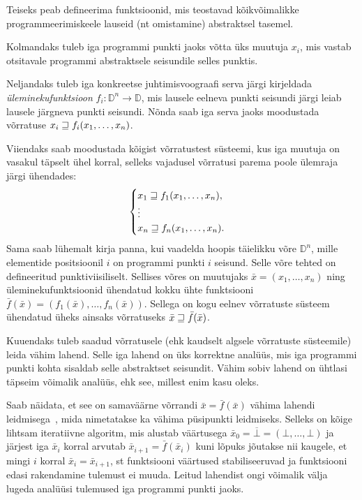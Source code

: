 \documentclass[../thesis.tex]{subfiles}
\begin{document}
Teiseks peab defineerima funktsioonid, mis teostavad kõikvõimalikke programmeerimiskeele lauseid (nt omistamine) abstraktsel tasemel.

Kolmandaks tuleb iga programmi punkti jaoks võtta üks muutuja $x_i$, mis vastab otsitavale programmi abstraktsele seisundile selles punktis.

Neljandaks tuleb iga konkreetse juhtimisvoograafi serva järgi kirjeldada \emph{üleminekufunktsioon} $f_i: \mathbb{D}^n \to \mathbb{D}$, mis lausele eelneva punkti seisundi järgi leiab lausele järgneva punkti seisundi. Nõnda saab iga serva jaoks moodustada võrratuse $x_i \sqsupseteq f_i(x_1, \ldots, x_n)$.

Viiendaks saab moodustada kõigist võrratustest süsteemi, kus iga muutuja on vasakul täpselt ühel korral, selleks vajadusel võrratusi parema poole ülemraja järgi ühendades:
\[
	\begin{cases}
		x_1 \sqsupseteq f_1(x_1, \ldots, x_n), \\
		\vdots \\
		x_n \sqsupseteq f_n(x_1, \ldots, x_n).
	\end{cases}
\]
Sama saab lühemalt kirja panna, kui vaadelda hoopis täielikku võre $\mathbb{D}^n$, mille elementide positsioonil $i$ on programmi punkti $i$ seisund. Selle võre tehted on defineeritud punktiviisiliselt. Sellises võres on muutujaks $\bar{x} = (x_1, \ldots, x_n)$ ning üleminekufunktsioonid ühendatud kokku ühte funktsiooni $\bar{f}(\bar{x}) = (f_1(\bar{x}), \ldots, f_n(\bar{x}))$. Sellega on kogu eelnev võrratuste süsteem ühendatud üheks ainsaks võrratuseks $\bar{x} \sqsupseteq \bar{f}(\bar{x})$.

Kuuendaks tuleb saadud võrratusele (ehk kaudselt algsele võrratuste süsteemile) leida vähim lahend. Selle iga lahend on üks korrektne analüüs, mis iga programmi punkti kohta sisaldab selle abstraktset seisundit. Vähim sobiv lahend on ühtlasi täpseim võimalik analüüs, ehk see, millest enim kasu oleks.

Saab näidata, et see on samaväärne võrrandi $\bar{x} = \bar{f}(\bar{x})$ vähima lahendi leidmisega~\cite[21]{seidl_foundations}, mida nimetatakse ka vähima püsipunkti leidmiseks. Selleks on kõige lihtsam iteratiivne algoritm, mis alustab väärtusega $\bar{x}_0 = \overline{\bot} = (\bot, \ldots, \bot)$ ja järjest iga $\bar{x}_i$ korral arvutab $\bar{x}_{i+1} = \bar{f}(\bar{x}_i)$ kuni lõpuks jõutakse nii kaugele, et mingi $i$ korral $\bar{x}_i = \bar{x}_{i+1}$, st funktsiooni väärtused stabiliseeruvad ja funktsiooni edasi rakendamine tulemust ei muuda. Leitud lahendist ongi võimalik välja lugeda analüüsi tulemused iga programmi punkti jaoks.
\end{document}
